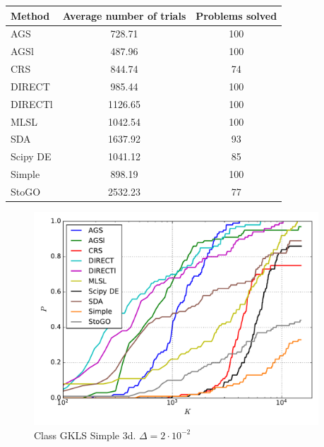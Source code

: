 \documentclass[a4paper]{article}
\begin{document}
\begin{tabular}{lcc}
\hline
 Method   &  Average number of trials  &  Problems solved  \\
\hline
 AGS      &           728.71           &        100        \\
 AGSl     &           487.96           &        100        \\
 CRS      &           844.74           &        74         \\
 DIRECT   &           985.44           &        100        \\
 DIRECTl  &          1126.65           &        100        \\
 MLSL     &          1042.54           &        100        \\
 SDA      &          1637.92           &        93         \\
 Scipy DE &          1041.12           &        85         \\
 Simple   &           898.19           &        100        \\
 StoGO    &          2532.23           &        77         \\
\hline
\end{tabular}
\begin{figure}[H]
  \center
  \includegraphics[width=0.95\textwidth]{../experiments/gklss3d/cmc.pdf}
  \caption{Class GKLS Simple 3d. $\Delta=2\cdot10^{-2}$}
\end{figure}
\end{document}
